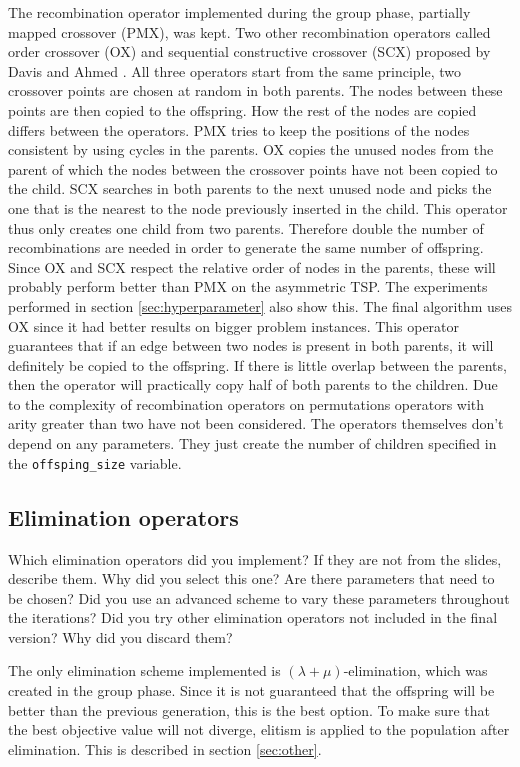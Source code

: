 \documentclass[a4paper,10pt]{article}
\newcommand{\ReplaceMe}[1]{{\color{blue}#1}}
\begin{document}
The recombination operator implemented during the group phase, partially mapped crossover (PMX), was kept. Two other recombination operators called order crossover (OX) and sequential constructive crossover (SCX) proposed by Davis \cite{davis} and Ahmed \cite{ahmed}. All three operators start from the same principle, two crossover points are chosen at random in both parents. The nodes between these points are then copied to the offspring. How the rest of the nodes are copied differs between the operators. PMX tries to keep the positions of the nodes consistent by using cycles in the parents. OX copies the unused nodes from the parent of which the nodes between the crossover points have not been copied to the child. SCX searches in both parents to the next unused node and picks the one that is the nearest to the node previously inserted in the child. This operator thus only creates one child from two parents. Therefore double the number of recombinations are needed in order to generate the same number of offspring.\\
Since OX and SCX respect the relative order of nodes in the parents, these will probably perform better than PMX on the asymmetric TSP. The experiments performed in section \ref{sec:hyperparameter} also show this. The final algorithm uses OX since it had better results on bigger problem instances. This operator guarantees that if an edge between two nodes is present in both parents, it will definitely be copied to the offspring. If there is little overlap between the parents, then the operator will practically copy half of both parents to the children. Due to the complexity of recombination operators on permutations operators with arity greater than two have not been considered. The operators themselves don't depend on any parameters. They just create the number of children specified in the \texttt{offsping\_size} variable.

\subsection{Elimination operators}

\ReplaceMe{Which elimination operators did you implement? If they are not from the slides, describe them. Why did you select this one? Are there parameters that need to be chosen? Did you use an advanced scheme to vary these parameters throughout the iterations? Did you try other elimination operators not included in the final version? Why did you discard them?} 

The only elimination scheme implemented is $(\lambda + \mu)$-elimination, which was created in the group phase. Since it is not guaranteed that the offspring will be better than the previous generation, this is the best option. To make sure that the best objective value will not diverge, elitism is applied to the population after elimination. This is described in section \ref{sec:other}.
\end{document}
